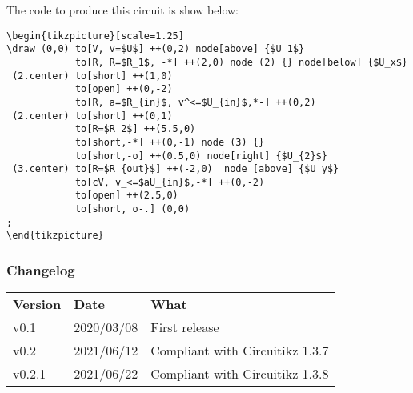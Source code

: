 \documentclass[12pt]{article}
\begin{document}
The code to produce this circuit is show below:

\begin{lstlisting}
\begin{tikzpicture}[scale=1.25]
\draw (0,0) to[V, v=$U$] ++(0,2) node[above] {$U_1$}
            to[R, R=$R_1$, -*] ++(2,0) node (2) {} node[below] {$U_x$}
 (2.center) to[short] ++(1,0)
            to[open] ++(0,-2)
            to[R, a=$R_{in}$, v^<=$U_{in}$,*-] ++(0,2) 
 (2.center) to[short] ++(0,1)
            to[R=$R_2$] ++(5.5,0)
            to[short,-*] ++(0,-1) node (3) {}
			to[short,-o] ++(0.5,0) node[right] {$U_{2}$}
 (3.center) to[R=$R_{out}$] ++(-2,0)  node [above] {$U_y$}
            to[cV, v_<=$aU_{in}$,-*] ++(0,-2)
			to[open] ++(2.5,0)
            to[short, o-.] (0,0)
;
\end{tikzpicture}
\end{lstlisting}
\subsubsection*{Changelog}

\begin{table}[!ht]
\begin{tabular}{lll}
\textbf{Version} & \textbf{Date} & \textbf{What} \\
v0.1    & 2020/03/08 & First release\\
v0.2    & 2021/06/12 & Compliant with Circuitikz 1.3.7\\
v0.2.1  & 2021/06/22 & Compliant with Circuitikz 1.3.8
\end{tabular}
\end{table}
\end{document}
